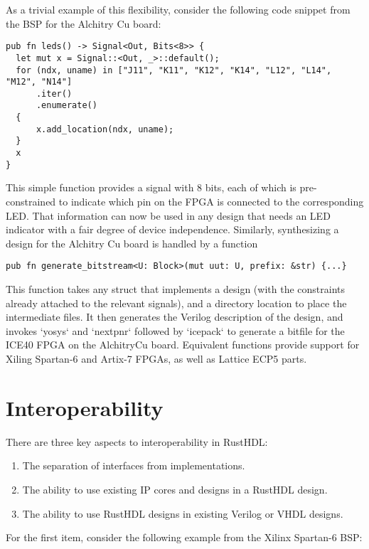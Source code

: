 \documentclass[conference]{IEEEtran}
\begin{document}
As a trivial example of this flexibility, consider the following code snippet from the BSP for the Alchitry Cu board:

\begin{verbatim}
pub fn leds() -> Signal<Out, Bits<8>> {
  let mut x = Signal::<Out, _>::default();
  for (ndx, uname) in ["J11", "K11", "K12", "K14", "L12", "L14", "M12", "N14"]
      .iter()
      .enumerate()
  {
      x.add_location(ndx, uname);
  }
  x
}
\end{verbatim}

This simple function provides a signal with 8 bits, each of which is pre-constrained to indicate which pin on the 
FPGA is connected to the corresponding LED.  That information can now be used in any design that needs an LED 
indicator with a fair degree of device independence.  Similarly, synthesizing a design for the Alchitry Cu board 
is handled by a function
\begin{verbatim}
pub fn generate_bitstream<U: Block>(mut uut: U, prefix: &str) {...}
\end{verbatim}

This function takes any struct that implements a design (with the constraints already attached to the relevant
signals), and a directory location to place the intermediate files.  It then generates the Verilog description of
the design, and invokes `yosys` and `nextpnr` followed by `icepack` to generate a bitfile for the ICE40 FPGA on the
AlchitryCu board.  Equivalent functions provide support for Xiling Spartan-6 and Artix-7 FPGAs, as well as Lattice ECP5 parts.

\section{Interoperability}

There are three key aspects to interoperability in RustHDL:

\begin{enumerate}
  \item The separation of interfaces from implementations.
  \item The ability to use existing IP cores and designs in a RustHDL design.
  \item The ability to use RustHDL designs in existing Verilog or VHDL designs.
\end{enumerate}

For the first item, consider the following example from the Xilinx Spartan-6 BSP:
\end{document}
